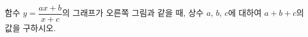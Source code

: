 \hspace*{2mm}\begin{minipage}[t]{\dimexpr\linewidth-2mm\relax}\vspace{0pt}
\noindent\begin{minipage}[t]{0.58\linewidth}\vspace{0pt}\raggedright 함수 $y=\dfrac{ax+b}{x+c}$의 그래프가 오른쪽 그림과 같을 때, 상수 $a$, $b$, $c$에 대하여 $a+b+c$의 값을 구하시오.\end{minipage}\hfill\begin{minipage}[t]{0.4\linewidth}\vspace{0pt}\centering \resizebox{\ifdim\width>\linewidth\linewidth\else\width\fi}{!}{}\end{minipage}\par\end{minipage}
